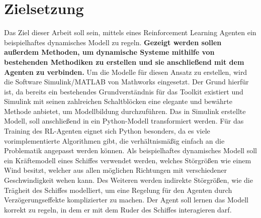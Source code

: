 \documentclass[]{iat}
\begin{document}
\section{Zielsetzung} \label{sec:zielsetzung}
Das Ziel dieser Arbeit soll sein, mittels eines Reinforcement Learning Agenten ein beispielhaftes dynamisches Modell zu regeln. \textbf{Gezeigt werden sollen außerdem Methoden, um dynamische Systeme mithilfe von bestehenden Methodiken zu erstellen und sie anschließend mit dem Agenten zu verbinden.} Um die Modelle für diesen Ansatz zu erstellen, wird die Software Simulink/MATLAB von Mathworks eingesetzt. \cite[]{simulink} Der Grund hierfür ist, da bereits ein bestehendes Grundverständnis für das Toolkit existiert und Simulink mit seinen zahlreichen Schaltblöcken eine elegante und bewährte Methode anbietet, um Modellbildung durchzuführen. Das in Simulink erstellte Modell, soll anschließend in ein Python-Modell transformiert werden. Für das Training des RL-Agenten eignet sich Python \cite[]{python} besonders, da es viele vorimplementierte Algorithmen gibt, die verhältnismäßig einfach an die Problematik angepasst werden können. Als beispielhaftes dynamisches Modell soll ein Kräftemodell eines Schiffes verwendet werden, welches Störgrößen wie einem Wind besitzt, welcher aus allen möglichen Richtungen mit verschiedener Geschwindigkeit wehen kann. Des Weiteren werden indirekte Störgrößen, wie die Trägheit des Schiffes modelliert, um eine Regelung für den Agenten durch Verzögerungseffekte komplizierter zu machen. Der Agent soll lernen das Modell korrekt zu regeln, in dem er mit dem Ruder des Schiffes interagieren darf.
\end{document}
